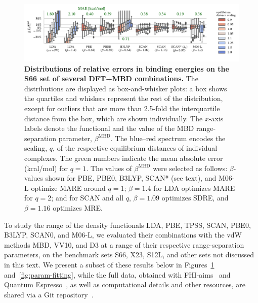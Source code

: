 \begin{figure}[t]
\includegraphics[center,width=0.95\linewidth]{media/s66-dists}
\caption{\textbf{Distributions of relative errors in binding energies on the S66 set of several DFT+MBD combinations.}
The distributions are displayed as box-and-whisker plots: a box shows the quartiles and whiskers represent the rest of the distribution, except for outliers that are more than 2.5-fold the interquartile distance from the box, which are shown individually.
The $x$-axis labels denote the functional and the value of the MBD range-separation parameter, $\beta^\text{MBD}$.
The blue--red spectrum encodes the scaling, $q$, of the respective equilibrium distances of individual complexes.
The green numbers indicate the mean absolute error (kcal/mol) for $q=1$.
The values of $\beta^\text{MBD}$ were selected as follows: $\beta$-values shown for PBE, PBE0, B3LYP, SCAN* (see text), and M06-L optimize MARE around $q=1$; $\beta=1.4$ for LDA optimizes MARE for $q=2$; and for SCAN and all $q$, $\beta=1.09$ optimizes SDRE, and $\beta=1.16$ optimizes MRE\@.
}\label{fig:s66-dists}
\end{figure}

To study the range of the density functionals LDA, PBE, TPSS, SCAN, PBE0, B3LYP, SCAN0, and M06-L, we evaluated their combinations with the vdW methods MBD, VV10, and D3 at a range of their respective range-separation parameters, on the benchmark sets S66, X23, S12L, and other sets not discussed in this text.
We present a subset of these results below in Figures~\ref{fig:s66-dists} and~\ref{fig:param-fitting}, while the full data, obtained with FHI-aims~\cite{BlumCPC09} and Quantum Espresso~\cite{GiannozziJPCM09,HamannPRB13}, as well as computational details and other resources, are shared via a Git repository~\cite{GitRepo}.

